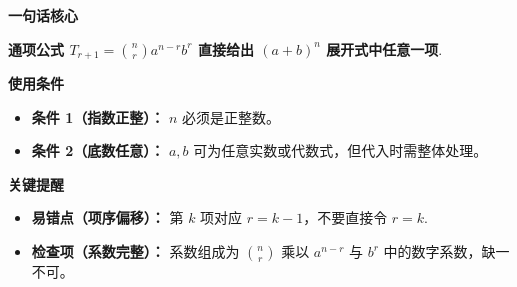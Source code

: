 \begin{summarybox}
	\textbf{\textcolor{CSummary}{一句话核心}}

	\textbf{通项公式 $T_{r+1}=\binom{n}{r}a^{n-r}b^{r}$ 直接给出 $(a+b)^n$ 展开式中任意一项}.

	\medskip
	\textbf{\textcolor{CSummary}{使用条件}}
	\begin{itemize}[leftmargin=*, itemsep=0.5em, topsep=0.4em]
		\item \textbf{条件 1（指数正整）：} $n$ 必须是正整数。
		\item \textbf{条件 2（底数任意）：} $a,b$ 可为任意实数或代数式，但代入时需整体处理。
	\end{itemize}

	\medskip
	\textbf{\textcolor{CSummary}{关键提醒}}
	\begin{itemize}[leftmargin=*, itemsep=0.5em, topsep=0.4em]
		\item \textbf{易错点（项序偏移）：} 第 $k$ 项对应 $r=k-1$，不要直接令 $r=k$.
		\item \textbf{检查项（系数完整）：} 系数组成为 $\binom{n}{r}$ 乘以 $a^{n-r}$ 与 $b^{r}$ 中的数字系数，缺一不可。
	\end{itemize}
\end{summarybox}
